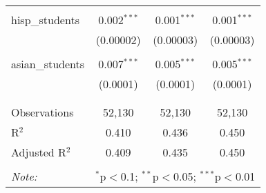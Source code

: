 \begin{table}[!htbp]
\begin{tabular}{@{\extracolsep{-2pt}}lccc}
  & & & \\ 
 hisp\_students & 0.002$^{***}$ & 0.001$^{***}$ & 0.001$^{***}$ \\ 
  & (0.00002) & (0.00003) & (0.00003) \\ 
  & & & \\ 
 asian\_students & 0.007$^{***}$ & 0.005$^{***}$ & 0.005$^{***}$ \\ 
  & (0.0001) & (0.0001) & (0.0001) \\ 
  & & & \\ 
\hline \\[-1.8ex] 
Observations & 52,130 & 52,130 & 52,130 \\ 
R$^{2}$ & 0.410 & 0.436 & 0.450 \\ 
Adjusted R$^{2}$ & 0.409 & 0.435 & 0.450 \\ 
\hline 
\hline \\[-1.8ex] 
\textit{Note:}  & \multicolumn{3}{r}{$^{*}$p$<$0.1; $^{**}$p$<$0.05; $^{***}$p$<$0.01} \\ 
\end{tabular} 
\end{table} 
